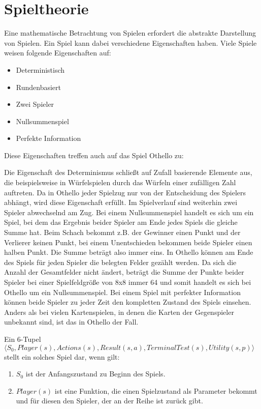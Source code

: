 \section{Spieltheorie}

Eine mathematische Betrachtung von Spielen erfordert die abstrakte Darstellung von Spielen.
Ein Spiel kann dabei verschiedene Eigenschaften haben. Viele Spiele weisen folgende Eigenschaften auf:

\begin{itemize}
    \item Deterministisch
    \item Rundenbasiert
    \item Zwei Spieler
    \item Nullsummenspiel
    \item Perfekte Information
\end{itemize}

Diese Eigenschaften treffen auch auf das Spiel Othello zu:

Die Eigenschaft des Determinismus schließt auf Zufall basierende Elemente aus, die beispielsweise in Würfelspielen durch das Würfeln einer zufälligen Zahl auftreten.
Da in Othello jeder Spielzug nur von der Entscheidung des Spielers abhängt, wird diese Eigenschaft erfüllt.
Im Spielverlauf sind weiterhin zwei Spieler abwechselnd am Zug.
Bei einem Nullsummenspiel handelt es sich um ein Spiel, bei dem das Ergebnis beider Spieler am Ende jedes Spiels die gleiche Summe hat.
Beim Schach bekommt z.B. der Gewinner einen Punkt und der Verlierer keinen Punkt, bei einem Unentschieden bekommen beide Spieler einen halben Punkt.
Die Summe beträgt also immer eins.
In Othello können am Ende des Spiels für jeden Spieler die belegten Felder gezählt werden.
Da sich die Anzahl der Gesamtfelder nicht ändert, beträgt die Summe der Punkte beider Spieler bei einer Spielfeldgröße von 8x8 immer 64 und somit handelt es sich bei Othello um ein Nullsummenspiel.
Bei einem Spiel mit perfekter Information können beide Spieler zu jeder Zeit den kompletten Zustand des Spiels einsehen.
Anders als bei vielen Kartenspielen, in denen die Karten der Gegenspieler unbekannt sind, ist das in Othello der Fall.
\cite[S.~161f.]{ai2010russel}

Ein 6-Tupel $\langle S_0, Player(s), Actions(s), Result(s, a), TerminalTest(s), Utility(s, p) \rangle$ stellt ein solches Spiel dar, wenn gilt:
\begin{enumerate}
    \item $S_0$ ist der Anfangszustand zu Beginn des Spiels.
    \item $Player(s)$ ist eine Funktion, die einen Spielzustand als Parameter bekommt und für diesen den Spieler, der an der Reihe ist zurück gibt.
\end{enumerate}
